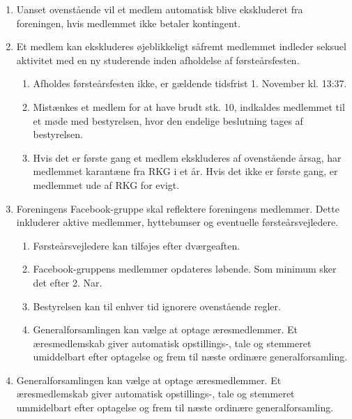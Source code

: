 \documentclass[a4paper, 10pt]{article}
\renewcommand\thesection{\textsection\arabic{section}}
\newenvironment{stykenum}{
  \begin{enumerate}[%
    label=Stk.~\arabic*:, ref=\textsection~\theenumi~Stk.~\arabic*, start=1]
}{\end{enumerate}}
\newenvironment{substykenum}{
  \begin{enumerate}[%
          label=Stk.~\arabic{enumi}.\arabic*:,
      ref=\thesection~Stk.~\arabic{enumi}.\arabic*, start=1]
}{\end{enumerate}}
\begin{document}
\begin{stykenum}
    \item Uanset ovenstående vil et medlem automatisk blive ekskluderet fra
        foreningen, hvis medlemmet ikke betaler kontingent.

    \item Et medlem kan ekskluderes øjeblikkeligt såfremt medlemmet indleder
        seksuel aktivitet med en ny studerende inden afholdelse af
        førsteårsfesten.
        \begin{substykenum}
            \item Afholdes førsteårsfesten ikke, er gældende tidsfrist 1.
                November kl. 13:37.

            \item Mistænkes et medlem for at have brudt stk. 10, indkaldes
                medlemmet til et møde med bestyrelsen, hvor den endelige
                beslutning tages af bestyrelsen.

            \item Hvis det er første gang et medlem ekskluderes af ovenstående
                årsag, har medlemmet karantæne fra RKG i et år. Hvis det ikke er
                første gang, er medlemmet ude af RKG for evigt.
        \end{substykenum}

    \item Foreningens Facebook-gruppe skal reflektere foreningens medlemmer.
        Dette inkluderer aktive medlemmer, hyttebumser og eventuelle
        førsteårsvejledere.
        \begin{substykenum}
            \item Førsteårsvejledere kan tilføjes efter dværgeaften.

            \item Facebook-gruppens medlemmer opdateres løbende. Som minimum
                sker det efter 2. Nar.

            \item Bestyrelsen kan til enhver tid ignorere ovenstående
                regler.

            \item \label{aeresmedlemmer} Generalforsamlingen kan vælge at optage
                æresmedlemmer. Et æresmedlemskab giver automatisk opstillings-,
                tale og stemmeret umiddelbart  efter optagelse og frem til næste
                ordinære generalforsamling.
        \end{substykenum}

    \item Generalforsamlingen kan vælge at optage æresmedlemmer. Et
        æresmedlemskab giver automatisk opstillings-, tale og stemmeret
        ummidelbart efter optagelse og frem til næste ordinære
        generalforsamling.
\end{stykenum}
\end{document}
